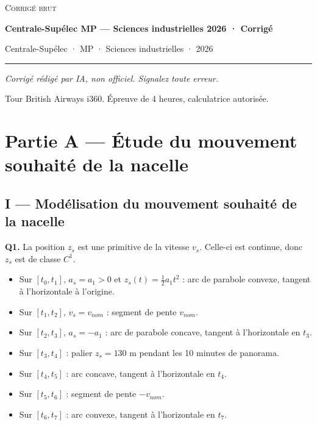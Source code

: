 \documentclass[11pt,a4paper]{article}
\providecommand{\tightlist}{\setlength{\itemsep}{0pt}\setlength{\parskip}{0pt}}
\begin{document}
\thispagestyle{plain}
\begin{center}
  {\small\scshape Corrigé brut}\par\smallskip
  {\LARGE\bfseries Centrale-Supélec MP — Sciences industrielles 2026 · Corrigé\par}\medskip
  {\large Centrale-Supélec · MP · Sciences industrielles · 2026\par}
\end{center}
\vspace{2pt}\hrule\vspace{8pt}

\emph{Corrigé rédigé par IA, non officiel. Signalez toute erreur.}

Tour British Airways i360. Épreuve de 4 heures, calculatrice autorisée.

\hypertarget{partie-a-uxe9tude-du-mouvement-souhaituxe9-de-la-nacelle}{%
\section{Partie A --- Étude du mouvement souhaité de la nacelle}\label{partie-a-uxe9tude-du-mouvement-souhaituxe9-de-la-nacelle}}

\hypertarget{i-moduxe9lisation-du-mouvement-souhaituxe9-de-la-nacelle}{%
\subsection{I --- Modélisation du mouvement souhaité de la nacelle}\label{i-moduxe9lisation-du-mouvement-souhaituxe9-de-la-nacelle}}

\textbf{Q1.} La position \(z_s\) est une primitive de la vitesse \(v_s\). Celle-ci est continue, donc \(z_s\) est de classe \(C^1\).

\begin{itemize}
\tightlist
\item
  Sur \([t_0,t_1]\), \(a_s=a_1>0\) et \(z_s(t)=\tfrac12 a_1t^2\) : arc de parabole convexe, tangent à l'horizontale à l'origine.
\item
  Sur \([t_1,t_2]\), \(v_s=v_{nom}\) : segment de pente \(v_{nom}\).
\item
  Sur \([t_2,t_3]\), \(a_s=-a_1\) : arc de parabole concave, tangent à l'horizontale en \(t_3\).
\item
  Sur \([t_3,t_4]\) : palier \(z_s=130\) m pendant les 10 minutes de panorama.
\item
  Sur \([t_4,t_5]\) : arc concave, tangent à l'horizontale en \(t_4\).
\item
  Sur \([t_5,t_6]\) : segment de pente \(-v_{nom}\).
\item
  Sur \([t_6,t_7]\) : arc convexe, tangent à l'horizontale en \(t_7\).
\end{itemize}
\end{document}
